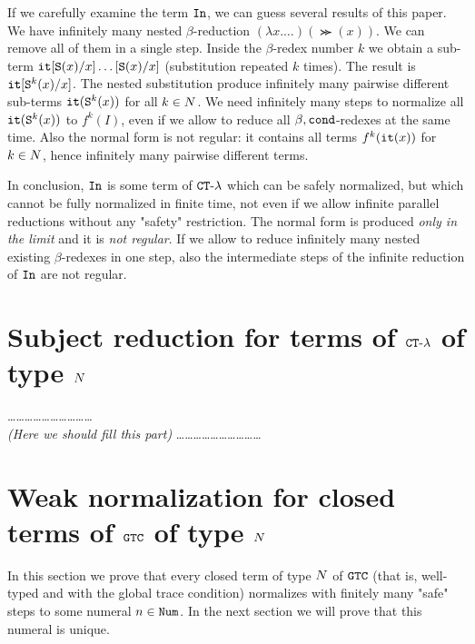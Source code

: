 \documentclass{article}
\begin{document}
If we carefully examine the term ${\tt In}$, we can guess several results of this paper.
We have infinitely many nested $\beta$-reduction $(\lambda x. \ldots)(\Succ (x))$.
We can remove all of them in a single step. Inside the $\beta$-redex number $k$ we obtain a sub-term
${\tt it}[{\tt S} (x)/x]\ldots[{\tt S} (x)/x]$ (substitution repeated $k$ times).
The result is ${\tt it}[{\tt S} ^k(x)/x] $.
The nested substitution produce infinitely many pairwise different sub-terms 
${\tt it}({\tt S} ^k(x))$ for all $k \in {N}$.
We need infinitely many steps to normalize all ${\tt it}({\tt S} ^k(x))$ to $f^k(I)$, 
even if we allow to reduce all $\beta,{\tt cond}$-redexes at the same time.
Also the normal form is not regular: it contains all terms $f^k({\tt it}(x))$ for $k \in {N}$, hence
infinitely many pairwise different terms. 

In conclusion, 
${\tt In}$ is some term of ${ {\tt CT} \mbox{-} \lambda}$ which can be safely normalized, but which 
cannot be fully normalized in finite time, not even if we allow
infinite parallel reductions without any "safety" restriction. 
The normal form is produced \emph{only in the limit}
and it is \emph{not regular}. If we allow to reduce infinitely many nested existing
$\beta$-redexes in one step, also
the intermediate steps of the infinite reduction of ${\tt In}$ are not regular.



\section{Subject reduction for terms of ${ {\tt CT} \mbox{-} \lambda}$ of type ${N}$}
\ldots\ldots\ldots\ldots\ldots\ldots\ldots\ldots\ldots\ldots
\\
\emph{(Here we should fill this part)}
\ldots\ldots\ldots\ldots\ldots\ldots\ldots\ldots\ldots\ldots


\section{Weak normalization for closed terms of ${\tt GTC}$ of type ${N}$}
\label{section-weak-normalization}
In this section we prove that every closed term of type ${N}$ of ${\tt GTC}$
 (that is, well-typed and with the global trace condition) normalizes with finitely many "safe" steps
to some numeral $n \in {\tt Num}$. In the next section we will prove that this numeral is unique.
\\
\end{document}
